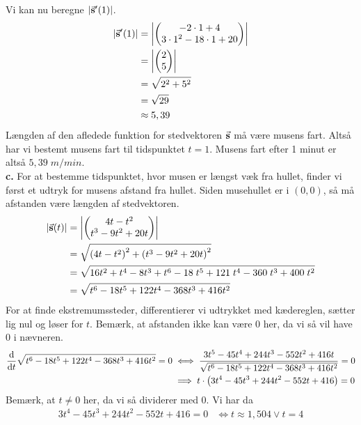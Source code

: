 \documentclass{article}
\begin{document}
Vi kan nu beregne $\abs{\va{s}'(1)} $.
\begin{equation*}
\begin{split}
  \abs{\va{s}'(1)} &=\abs{\mqty(-2 \cdot 1 + 4\\ 3 \cdot 1^2-18 \cdot 1 + 20) } \\
  &=\abs{\mqty(2\\ 5) } \\
  &=\sqrt{2^2+5^2} \\
  &=\sqrt{29} \\
  &\approx 5,39
\end{split}
\end{equation*}
Længden af den afledede funktion for stedvektoren $\va{s} $ må være musens fart. 
Altså har vi bestemt musens fart til tidspunktet $t=1$.
Musens fart efter 1 minut er altså $5,39 \;\unit{m/min} $.\\[1ex]
\textbf{c.}
For at bestemme tidspunktet, hvor musen er længst væk fra hullet, finder vi først et udtryk for musens afstand fra hullet.
Siden musehullet er i $(0,0)$, så må afstanden være længden af stedvektoren.
\begin{equation*}
\begin{split}
  \abs{\va{s} (t)} &=\abs{\mqty(4t-t^2\\ t^3-9t^2+20t) } \\
  &=\sqrt{\left(4t-t^2\right)^2+\left(t^3-9t^2+20t\right)^2} \\
  &=\sqrt{16t^2+t^4-8t^3+t^{6} - 18 \; t^{5} + 121 \; t^{4} - 360 \; t^{3} + 400 \; t^{2}}\\
  &=\sqrt{t^6-18t^5+122 t^4-368 t^3+416 t^2} 
\end{split}
\end{equation*}
For at finde ekstremumssteder, differentierer vi udtrykket med kædereglen, sætter lig nul og løser for $t$.
Bemærk, at afstanden ikke kan være $0$ her, da vi så vil have 0 i nævneren. 
\begin{equation*}
\begin{split}
  \dv{t} \sqrt{t^6-18t^5+122 t^4-368 t^3+416 t^2} =0 &\iff \frac{3t^5-45t^4+244t^3-552t^2+416t}{\sqrt{t^6-18t^5+122 t^4-368 t^3+416 t^2} }=0\\
  &\implies t \cdot \left(3t^4-45t^3+244t^2-552t +416\right) =0
\end{split}
\end{equation*}
Bemærk, at $t \neq 0$ her, da vi så dividerer med 0. 
Vi har da
\begin{equation*}
\begin{split}
  3t^4-45t^3+244t^2-552t +416=0 &\iff t \approx 1,504 \lor t=4
\end{split}
\end{equation*}
\end{document}

